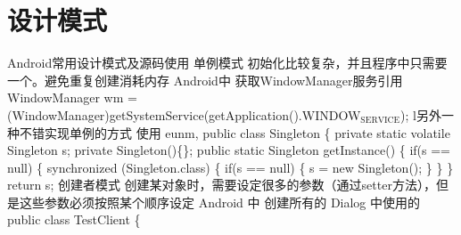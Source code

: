 \documentclass[9pt, b5paper]{article}
\begin{document}
\section{设计模式}
\label{sec-15}
Android常用设计模式及源码使用
单例模式
初始化比较复杂，并且程序中只需要一个。避免重复创建消耗内存
Android中 获取WindowManager服务引用 WindowManager wm = (WindowManager)getSystemService(getApplication().WINDOW$_{\text{SERVICE}}$);
l另外一种不错实现单例的方式 使用 eunm,
public class Singleton \{
    private static volatile Singleton s;
    private Singleton()\{\};
    public static Singleton getInstance() \{  
        if(s == null) \{
            synchronized (Singleton.class) \{
                if(s == null) \{
                    s = new Singleton(); 
                \}
            \}
        \}
        return s; 
创建者模式
创建某对象时，需要设定很多的参数（通过setter方法），但是这些参数必须按照某个顺序设定
Android 中 创建所有的 Dialog 中使用的
public class TestClient \{
\end{document}
